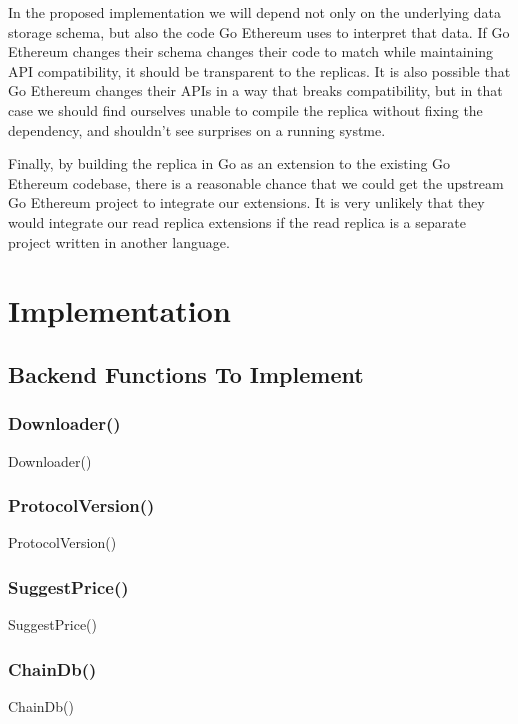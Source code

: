 \documentclass[letterpaper,10pt,english]{sphinxmanual}
\begin{document}
In the proposed implementation we will depend not only on the underlying data
storage schema, but also the code Go Ethereum uses to interpret that data. If
Go Ethereum changes their schema  changes their code to match while
maintaining API compatibility, it should be transparent to the replicas. It is
also possible that Go Ethereum changes their APIs in a way that breaks
compatibility, but in that case we should find ourselves unable to compile the
replica without fixing the dependency, and shouldn’t see surprises on a running
systme.

Finally, by building the replica in Go as an extension to the existing Go
Ethereum codebase, there is a reasonable chance that we could get the upstream
Go Ethereum project to integrate our extensions. It is very unlikely that they
would integrate our read replica extensions if the read replica is a separate
project written in another language.


\chapter{Implementation}
\label{\detokenize{topics/implementation:implementation}}\label{\detokenize{topics/implementation::doc}}

\section{Backend Functions To Implement}
\label{\detokenize{topics/implementation:backend-functions-to-implement}}

\subsection{Downloader()}
\label{\detokenize{topics/implementation:downloader}}
Downloader()


\subsection{ProtocolVersion()}
\label{\detokenize{topics/implementation:protocolversion}}
ProtocolVersion()


\subsection{SuggestPrice()}
\label{\detokenize{topics/implementation:suggestprice}}
SuggestPrice()


\subsection{ChainDb()}
\label{\detokenize{topics/implementation:chaindb}}
ChainDb()
\end{document}
